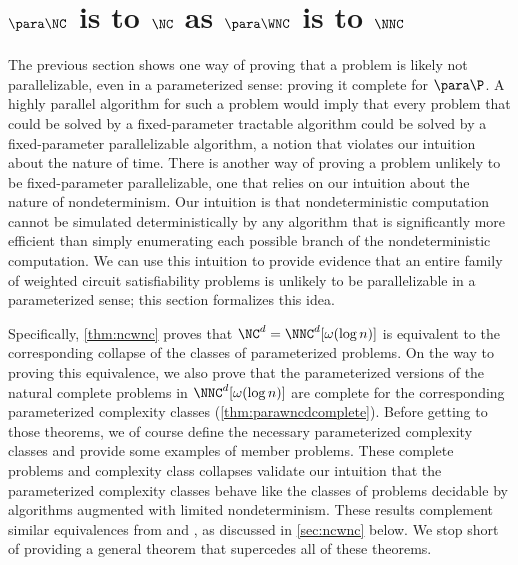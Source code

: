 \section{\texorpdfstring{$\para \NC$}{paraNC} is to \texorpdfstring{$\NC$}{NC} as \texorpdfstring{$\para \WNC$}{paraWNC} is to \texorpdfstring{$\NNC$}{NNC}}

%
%
%
The previous section shows one way of proving that a problem is likely not parallelizable, even in a parameterized sense: proving it complete for $\para \P$.
A highly parallel algorithm for such a problem would imply that every problem that could be solved by a fixed-parameter tractable algorithm could be solved by a fixed-parameter parallelizable algorithm, a notion that violates our intuition about the nature of time.
%
%
%
There is another way of proving a problem unlikely to be fixed-parameter parallelizable, one that relies on our intuition about the nature of nondeterminism.
Our intuition is that nondeterministic computation cannot be simulated deterministically by any algorithm that is significantly more efficient than simply enumerating each possible branch of the nondeterministic computation.
%
%
%
We can use this intuition to provide evidence that an entire family of weighted circuit satisfiability problems is unlikely to be parallelizable in a parameterized sense;
%
%
%
this section formalizes this idea.

%
%
%
Specifically, \autoref{thm:ncwnc} proves that $\NC^d = \NNC^d[\omega(\log n)]$ is equivalent to the corresponding collapse of the classes of parameterized problems.
On the way to proving this equivalence, we also prove that the parameterized versions of the natural complete problems in $\NNC^d[\omega(\log n)]$ are complete for the corresponding parameterized complexity classes (\autoref{thm:parawncdcomplete}).
Before getting to those theorems, we of course define the necessary parameterized complexity classes and provide some examples of member problems.
%
%
%
These complete problems and complexity class collapses validate our intuition that the parameterized complexity classes behave like the classes of problems decidable by algorithms augmented with limited nondeterminism.
%
%
These results complement similar equivalences from \autocite[Theorem~3.29]{fg06} and \autocite[Theorem~15]{cm14}, as discussed in \autoref{sec:ncwnc} below.
We stop short of providing a general theorem that supercedes all of these theorems.

